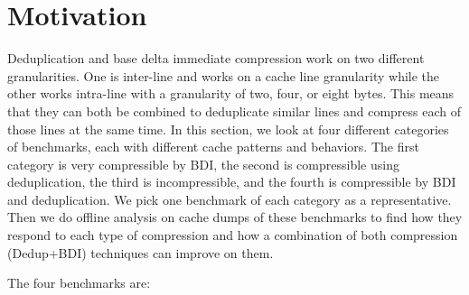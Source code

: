 \section{Motivation}
\label{sec:Motivation}
Deduplication and base delta immediate compression work on two different granularities. One is inter-line and works on a cache line granularity while the other works intra-line with a granularity of two, four, or eight bytes. This means that they can both be combined to deduplicate similar lines and compress each of those lines at the same time.
In this section, we look at four different categories of benchmarks, each with different cache patterns and behaviors. The first category is very compressible by BDI, the second is compressible using deduplication, the third is incompressible, and the fourth is compressible by BDI and deduplication. We pick one benchmark of each category as a representative. Then we do offline analysis on cache dumps of these benchmarks to find how they respond to each type of compression and how a combination of both compression (Dedup+BDI) techniques can improve on them.\par
The four benchmarks are:

